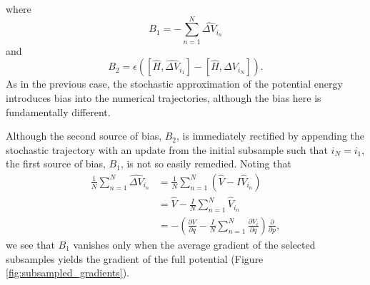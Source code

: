 \documentclass{article}
\begin{document}
%
where
%
\begin{equation*}
B_{1} = - \sum_{n = 1}^{N} \widehat{ \Delta V}_{i_{n}}
\end{equation*}
%
and
%
\begin{equation*}
B_{2} = \epsilon 
\left( \left[ \hat{H}, \widehat{ \Delta V}_{i_{1}} \right] 
- \left[ \hat{H}, \widehat{ \Delta V}_{i_{N}} \right] \right).
\end{equation*}
%
As in the previous case, the stochastic approximation of the potential energy
introduces bias into the numerical trajectories, although the bias here is 
fundamentally different.

Although the second source of bias, $B_{2}$, is immediately rectified by appending the 
stochastic trajectory with an update from the initial subsample such that $i_{N} = i_{1}$, 
the first source of bias, $B_{1}$, is not so easily remedied.  Noting that
%
\begin{align*}
\frac{1}{N} \sum_{n = 1}^{N}  \widehat{ \Delta V}_{i_{n}}
&=
\frac{1}{N} \sum_{n = 1}^{N} \left( \hat{V} - I \hat{V}_{i_{n}} \right)
\\
&=
\hat{V} - \frac{I}{N} \sum_{n = 1}^{N} \hat{V}_{i_{n}}
\\
&=
- \left( \frac{ \partial V }{ \partial q }  - \frac{I}{N} \sum_{n = 1}^{N} \frac{ \partial V_{i} }{ \partial q }
\right) \frac{ \partial }{ \partial p },
\end{align*}
%
we see that $B_{1}$ vanishes only when the average gradient of the selected 
subsamples yields the gradient of the full potential (Figure \ref{fig:subsampled_gradients}).
\end{document}
